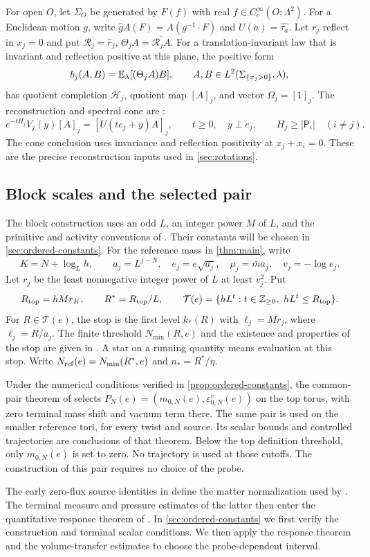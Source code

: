For open $O$, let $\Sigma_O$ be generated by $F(f)$ with real
$f\in C_c^\infty(O;\Lambda^2)$. For a Euclidean motion $g$,
write $\widehat g A(F)=A(g^{-1}\cdot F)$ and $U(a)=\widehat{\tau_a}$.
Let $r_j$ reflect in $x_j=0$ and put
$\mathcal R_j=\widehat r_j$, $\Theta_j A=\overline{\mathcal R_jA}$.
For a translation-invariant law that is invariant and reflection
positive at this plane, the positive form
\[
 b_j(A,B)=\mathbb E_\lambda[(\Theta_jA)B],\qquad
 A,B\in L^2(\Sigma_{\{x_j>0\}},\lambda),
\]
has quotient completion $\mathcal H_j$, quotient map $[A]_j$,
and vector $\Omega_j=[1]_j$. The reconstruction and spectral cone
are \cite[Propositions~2.1 and~3.1]{ErgodicComponents}:
\[
 e^{-tH_j}V_j(y)[A]_j=[U(te_j+y)A]_j,\qquad
 t\ge0,\quad y\perp e_j,\qquad H_j\ge|\mathsf P_i|\quad(i\ne j).
\]
The cone conclusion uses invariance and reflection positivity at
$x_j+x_i=0$. These are the precise reconstruction inputs used in
\cref{sec:rotations}.

\subsection{Block scales and the selected pair}\label{subsec:integration-block-data}
The block construction uses an odd $L$, an integer power $M$ of $L$,
and the primitive and activity conventions of
\cite{MaxwellBlock,FermionBlock,NormalizedContraction,NonlinearStep,CoverTuning}.
Their constants will be chosen in \cref{sec:ordered-constants}.
For the reference mass in \cref{thm:main}, write
\[
 K=N+\log_Lh,\qquad a_j=L^{j-N},\quad e_j=e\sqrt{a_j},
 \quad\mu_j=\bar m a_j,\quad v_j=-\log e_j.
\]
Let $r_j$ be the least nonnegative integer power of $L$ at least
$v_j^2$. Put
\[
 R_{\rm top}=hMr_K,\qquad R^*=R_{\rm top}/L,\qquad
 \mathcal T(e)=\{hL^t:t\in\mathbb Z_{\ge0},\ hL^t\le R_{\rm top}\}.
\]
For $R\in\mathcal T(e)$, the stop is the first level
$k_*(R)$ with $\ell_j=Mr_j$, where $\ell_j=R/a_j$.
The finite threshold $N_{\min}(R,e)$ and the existence and
properties of the stop are given in \cite[Proposition~6.1]{CoverTuning}.
A star on a running quantity means evaluation at this stop.
Write $N_{\rm ref}(e)=N_{\min}(R^*,e)$ and $n_*=R^*/\eta$.

Under the numerical conditions verified in \cref{prop:ordered-constants}, the common-pair theorem
of \cite[Theorem~A]{CoverTuning} selects
$P_N(e)=(m_{0,N}(e),\varepsilon^v_{0,N}(e))$ on the top torus,
with zero terminal mass shift and vacuum term there. The same pair
is used on the smaller reference tori, for every twist and source.
Its scalar bounds and controlled trajectories are conclusions of
that theorem. Below the top definition threshold, only
$m_{0,N}(e)$ is set to zero. No trajectory is used at those cutoffs.
The construction of this pair requires no choice of the probe.

The early zero-flux source identities in
\cite[Section~3]{ReferenceResponse} define the matter normalization
used by \cite{TerminalPressure}. The terminal measure and pressure
estimates of the latter then enter the quantitative response theorem
of \cite{ReferenceResponse}. In \cref{sec:ordered-constants} we
first verify the construction and terminal scalar conditions.
We then apply the response theorem and the volume-transfer estimates
to choose the probe-dependent interval.
